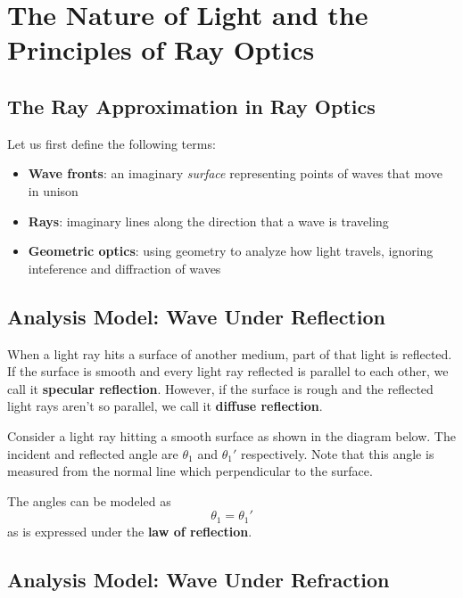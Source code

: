 \chapter{The Nature of Light and the Principles of Ray Optics}

\section{The Ray Approximation in Ray Optics}

Let us first define the following terms:
\begin{itemize}
    \item \textbf{Wave fronts}: an imaginary \textit{surface} representing points of waves that move 
        in unison
    \item \textbf{Rays}: imaginary lines along the direction that a wave is traveling
    \item \textbf{Geometric optics}: using geometry to analyze how light travels, ignoring inteference
        and diffraction of waves
\end{itemize}

\section{Analysis Model: Wave Under Reflection}

When a light ray hits a surface of another medium, part of that light is reflected. If the surface 
is smooth and every light ray reflected is parallel to each other, we call it \textbf{specular
reflection}. However, if the surface is rough and the reflected light rays aren't so parallel, we
call it \textbf{diffuse reflection}.

Consider a light ray hitting a smooth surface as shown in the diagram below. The incident and 
reflected angle are $\theta_1$ and $\theta_1'$ respectively. Note that this angle is measured from 
the normal line which perpendicular to the surface.

The angles can be modeled as 
\begin{equation}\label{35.2}
    \theta_1 = \theta_1'
\end{equation}
as is expressed under the \textbf{law of reflection}.

\section{Analysis Model: Wave Under Refraction}

